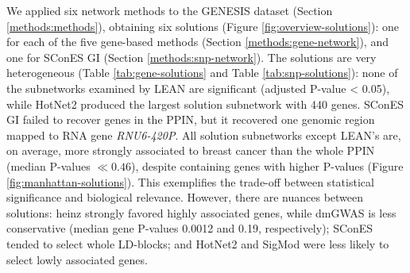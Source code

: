 \documentclass[
  11pt,
]{env/yjiao}
\begin{document}
\begin{table}

\caption{\label{tab:snp-solutions}Summary statistics on the results of SConES on the three SNP-SNP interaction networks. The first row within each block contains the summary statistics on the whole network.}
\centering
{}
\end{table}

We applied six network methods to the GENESIS dataset (Section
\ref{methods:methods}), obtaining six solutions (Figure
\ref{fig:overview-solutions}): one
for each of the five gene-based methods (Section
\ref{methods:gene-network}), and one for SConES GI (Section
\ref{methods:snp-network}). The solutions are very heterogeneous
(Table \ref{tab:gene-solutions} and Table
\ref{tab:snp-solutions}): none of the subnetworks examined by
LEAN are significant (adjusted P-value \textless{} 0.05), while HotNet2 produced
the largest solution subnetwork with 440 genes. SConES GI failed to
recover genes in the PPIN, but it recovered one genomic region mapped to
RNA gene \emph{RNU6-420P}. All solution subnetworks except LEAN's are, on
average, more strongly associated to breast cancer than the whole PPIN
(median P-values \(\ll 0.46\)), despite containing genes with higher
P-values (Figure \ref{fig:manhattan-solutions}). This exemplifies the
trade-off between statistical significance and biological relevance. However,
there are nuances between solutions: heinz strongly favored highly
associated genes, while dmGWAS is less conservative (median gene
P-values 0.0012 and 0.19, respectively); SConES tended to select whole
LD-blocks; and HotNet2 and SigMod were less likely to select lowly
associated genes.
\end{document}
